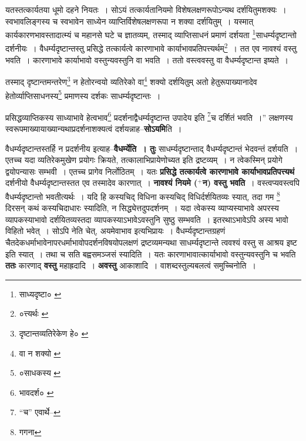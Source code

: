 \documentclass[article,12pt,a4paper]{memoir}
\newcommand{\add}[1]{($^{+}$#1)}
\begin{document}
	यतस्तत्कार्यतया धूमो दहने नियतः । सोऽयं तत्कार्यतानियमो विशेषलक्षणरूपोऽन्यथ दर्शयितुमशक्यः । स्वभावलिङ्गस्य च स्वभावेन साध्येन व्याप्तिर्विशेषलक्षणरूपा न शक्या दर्शयितुम् । यस्मात् कार्यकारणभावस्तादात्म्यं च महानसे घटे च ज्ञातव्यम्, तस्माद् व्याप्तिसाधनं प्रमाणं दर्शयता \footnote{साध्यदृष्टा० \cite{dp-msB}}\-साधर्म्यदृष्टान्तो दर्शनीयः । वैधर्म्यदृष्टान्तस्तु प्रसिद्धे तत्कार्यत्वे कारणाभावे कार्याभावप्रतिपत्त्यर्थम्\footnote{०त्त्यर्थः \cite{dp-edE}} । तत एव नावश्यं वस्तु भवति । कारणाभावे कार्याभावो वस्तुन्यवस्तुनि वा भवति । ततो वस्त्ववस्तु वा वैधर्म्यदृष्टान्त इष्यते । 
	  
	तस्माद् दृष्टान्तमन्तरेण\footnote{दृष्टान्तव्यतिरेकेण हे० \cite{dp-msA} \cite{dp-edP} \cite{dp-edH} \cite{dp-edE} \cite{dp-edN}} न हेतोरन्वयो व्यतिरेको वा\footnote{वा न शक्यो \cite{dp-msA} \cite{dp-edP} \cite{dp-edH} \cite{dp-edE} \cite{dp-edN}} शक्यो दर्शयितुम् अतो हेतुरूपाख्यानादेव हेतोर्व्याप्तिसाधनस्य\footnote{०साधकस्य \cite{dp-edE}} प्रमाणस्य दर्शकः साधर्म्यदृष्टान्तः । 
	  
	प्रसिद्धव्याप्तिकस्य साध्याभावे हेत्वभाव\footnote{भावदर्श० \cite{dp-msC} \cite{dp-msD}} प्रदर्शनाद्वैधर्म्यदृष्टान्त उपादेय इति \footnote{“च” एवार्थे--\cite{dp-msD-n}}\-च दर्शितं भवति ।” लक्षणस्य स्वरूपमाख्यायाख्यान्यथाप्रदर्शनाशक्यत्वं दर्शयन्नाह--\textbf{सोऽयमि}ति ।
	\pend
      

	  \pstart वैधर्म्यदृष्टान्तस्तर्हि न प्रदर्शनीय इत्याह--\textbf{वैधर्म्येति । तुः} साधर्म्यदृष्टान्ताद् वैधर्म्यदृष्टान्तं भेदवन्तं दर्शयति । एतच्च यदा व्यतिरेकमुखेण प्रयोगः क्रियते, तत्कालाभिप्रायेणोच्यत इति द्रष्टव्यम् । न त्वेकस्मिन् प्रयोगे द्वयोपन्यासः सम्भवी । एतच्च प्रागेव निर्लोठितम् । यतः \textbf{प्रसिद्धे तत्कार्यत्वे कारणाभावे कार्याभावप्रतिपत्त्यथं} दर्शनीयो वैधर्म्यदृष्टान्तस्तत एव तस्मादेव कारणात् । \textbf{नावश्यं नियमे \add{न} वस्तु भवति} । वस्त्वप्यवस्त्वपि वैधर्म्यदृष्टान्तो भवतीत्यर्थः । यदि हि कस्यचिद् विधिना कस्यचिद् विधिर्दर्शयितव्यः स्यात्, तदा गम \footnote{गगना} दिरसन् कथं कस्यचिदाधारः स्यादिति, न सिद्ध्येत्तदुपदर्शनम् । यदा त्वेकस्य व्याप्यस्याभावे अपरस्य व्यापकस्याभावो दर्शयितव्यस्तदा व्यापकस्याऽभावेऽवस्तुनि सुष्ठु सम्भवति । इतरथाऽभावेऽपि अस्य भावो विहितो भवेत् । सोऽपि नेति चेत्, अयमेवाभाव इत्यभिप्रायः । वैधर्म्यदृष्टान्तग्रहणं चैतदेकधर्माभावेनापरधर्माभावोपदर्शनविषयोपलक्षणं द्रष्टव्यमन्यथा साधर्म्यदृष्टान्ते त्ववश्यं वस्तु स आश्रय इष्ट इति स्यात् । तथा च सति बह्वसमञ्जसं स्यादिति । यतः कारणाभावात्कार्याभावो वस्तुन्यवस्तुनि च भवति \textbf{ततः} कारणाद् \textbf{वस्तु} महाह्रदादि । \textbf{अवस्तु} आकाशादि । वाशब्दस्तुल्यबलत्वं समुच्चिनोति ।
	\pend
      
\end{document}
